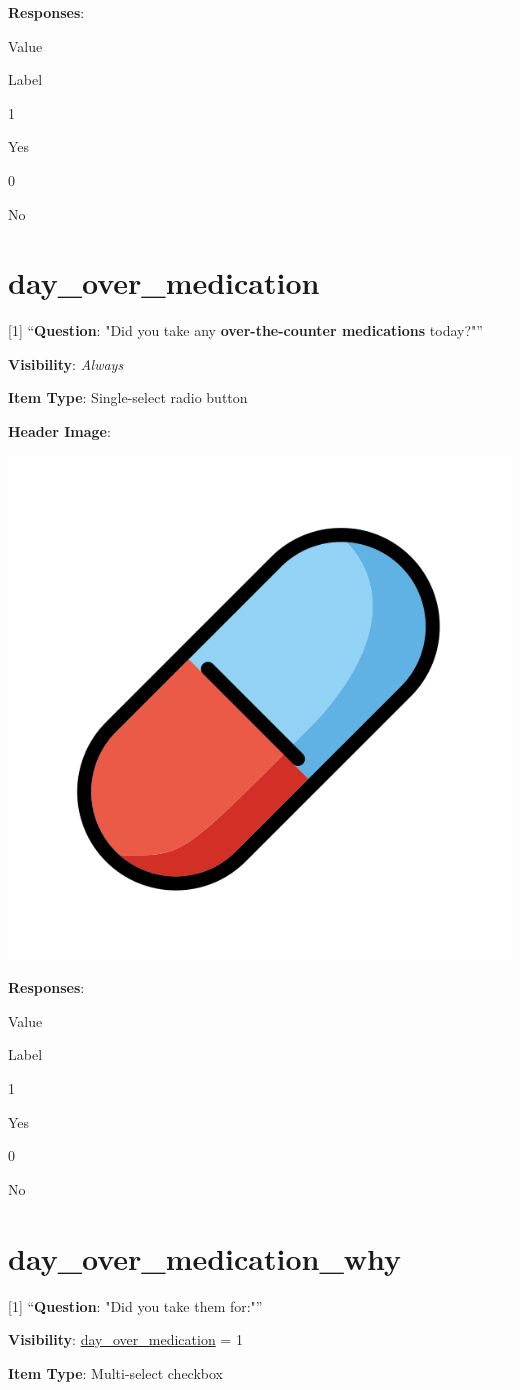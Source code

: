 \documentclass[]{book}
\begin{document}
\textbf{Responses}:

Value

Label

1

Yes

0

No

\hypertarget{day_over_medication}{%
\section{day\_over\_medication}\label{day_over_medication}}

{[}1{]} ``\textbf{Question}: "Did you take any \textbf{over-the-counter medications} today?"''

\textbf{Visibility}: \emph{Always}

\textbf{Item Type}: Single-select radio button

\textbf{Header Image}:

\begin{flushleft}\includegraphics[width=0.33\linewidth]{downloadFigs4latex_NIMH_Applet_Codebook/day_over_medication_headerImg} \end{flushleft}

\textbf{Responses}:

Value

Label

1

Yes

0

No

\hypertarget{day_over_medication_why}{%
\section{day\_over\_medication\_why}\label{day_over_medication_why}}

{[}1{]} ``\textbf{Question}: "Did you take them for:"''

\textbf{Visibility}: \protect\hyperlink{day_over_medication}{day\_over\_medication} = 1

\textbf{Item Type}: Multi-select checkbox
\end{document}
